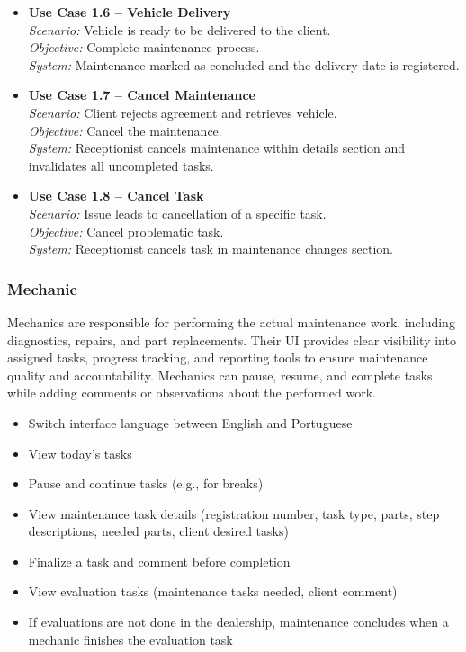 \begin{itemize}
    \item \textbf{Use Case 1.6 – Vehicle Delivery}\\
    \textit{Scenario:} Vehicle is ready to be delivered to the client.\\
    \textit{Objective:} Complete maintenance process.\\
    \textit{System:} Maintenance marked as concluded and the delivery date is registered.
    \item \textbf{Use Case 1.7 – Cancel Maintenance}\\
    \textit{Scenario:} Client rejects agreement and retrieves vehicle.\\
    \textit{Objective:} Cancel the maintenance.\\
    \textit{System:} Receptionist cancels maintenance within details section and invalidates all uncompleted tasks.
    \item \textbf{Use Case 1.8 – Cancel Task}\\
    \textit{Scenario:} Issue leads to cancellation of a specific task.\\
    \textit{Objective:} Cancel problematic task.\\
    \textit{System:} Receptionist cancels task in maintenance changes section.
\end{itemize}


\subsubsection{Mechanic}

Mechanics are responsible for performing the actual maintenance work, including diagnostics, repairs, and part replacements. Their \ac{UI} provides clear visibility into assigned tasks, progress tracking, and reporting tools to ensure maintenance quality and accountability. Mechanics can pause, resume, and complete tasks while adding comments or observations about the performed work.


\begin{itemize}
    \item Switch interface language between English and Portuguese
    \item View today's tasks
    \item Pause and continue tasks (e.g., for breaks)
    \item View maintenance task details (registration number, task type, parts, step descriptions, needed parts, client desired tasks)
    \item Finalize a task and comment before completion
    \item View evaluation tasks (maintenance tasks needed, client comment)
    \item If evaluations are not done in the dealership, maintenance concludes when a mechanic finishes the evaluation task
\end{itemize}

